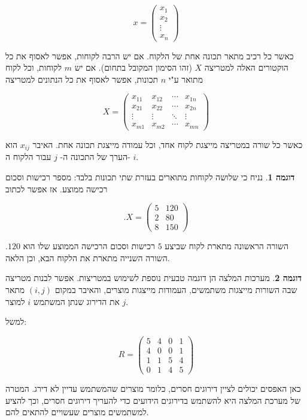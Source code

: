 \documentclass[12pt]{report}
\theoremstyle{plain}
\theoremstyle{definition}
\newtheorem{example}{דוגמה}[chapter]
\newcommand{\0}{\mathbf{0}}
\begin{document}
$$
x =
\begin{pmatrix}
x_1 \\
x_2 \\
\vdots \\
x_n
\end{pmatrix}
$$

כאשר כל רכיב מתאר תכונה אחת של הלקוח. אם יש הרבה לקוחות, אפשר לאסוף את כל הוקטורים האלה למטריצה
$X$
(זהו הסימון המקובל בתחום).
אם יש
$m$
לקוחות, וכל לקוח מתואר ע"י
$n$
תכונות, אפשר לאסוף את כל הנתונים למטריצה

$$
X =
\begin{pmatrix}
x_{11} & x_{12} & \cdots & x_{1n} \\
x_{21} & x_{22} & \cdots & x_{2n} \\
\vdots & \vdots & \ddots & \vdots \\
x_{m1} & x_{m2} & \cdots & x_{mn}
\end{pmatrix}
$$

כאשר כל שורה במטריצה מייצגת לקוח אחד, וכל עמודה מייצגת תכונה אחת.
האיבר
$x_{ij}$
הוא הערך של התכונה ה-
$j$
עבור הלקוח ה-
$i$.

\begin{example}
נניח כי שלושה לקוחות מתוארים בעזרת שתי תכונות בלבד: מספר רכישות וסכום רכישה ממוצע. אז אפשר לכתוב

$$
.X =
\begin{pmatrix}
5 & 120 \\
2 & 80 \\
8 & 150
\end{pmatrix}
$$

השורה הראשונה מתארת לקוח שביצע
$5$
רכישות וסכום הרכישה הממוצע שלו הוא
$120$.
השורה השנייה מתארת את הלקוח הבא, וכן הלאה.
\end{example}

\begin{example}
מערכות המלצה הן דוגמה טבעית נוספת לשימוש במטריצות.
אפשר לבנות מטריצה שבה השורות מייצגות משתמשים, העמודות מייצגות מוצרים, והאיבר במקום
$(i,j)$
מתאר את הדירוג שנתן המשתמש
$i$
למוצר
$j$.

למשל:

$$
R =
\begin{pmatrix}
5 & 4 & 0 & 1 \\
4 & 0 & 0 & 1 \\
1 & 1 & 5 & 4 \\
0 & 1 & 4 & 5
\end{pmatrix}
$$

כאן האפסים יכולים לציין דירוגים חסרים, כלומר מוצרים שהמשתמש עדיין לא דירג.
המטרה של מערכת המלצה היא להשתמש בדירוגים הידועים כדי להעריך דירוגים חסרים, וכך להציע למשתמשים מוצרים שעשויים להתאים להם.
\end{example}
\end{document}
